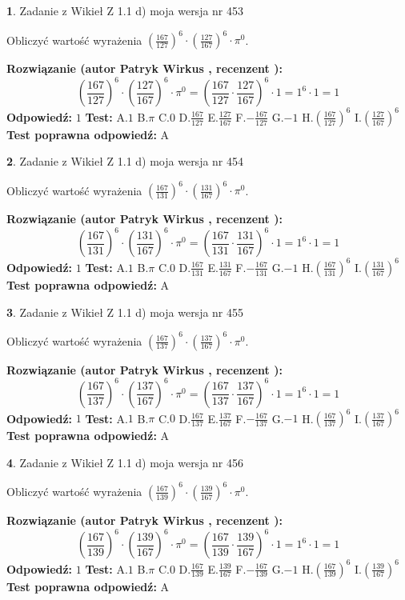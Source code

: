 \documentclass[12pt, a4paper]{article}
\theoremstyle{definition} %
\newtheorem{zad}{}
\newcommand{\zadStart}[1]{\begin{zad}#1\newline}
\newcommand{\zadStop}{\end{zad}}
\newcommand{\rozwStart}[2]{\noindent \textbf{Rozwiązanie (autor #1 , recenzent #2): }\newline}
\newcommand{\rozwStop}{\newline}
\newcommand{\odpStart}{\noindent \textbf{Odpowiedź:}\newline}
\newcommand{\odpStop}{\newline}
\newcommand{\testStart}{\noindent \textbf{Test:}\newline}
\newcommand{\testStop}{\newline}
\newcommand{\kluczStart}{\noindent \textbf{Test poprawna odpowiedź:}\newline}
\newcommand{\kluczStop}{\newline}
\begin{document}
\zadStart{Zadanie z Wikieł Z 1.1 d) moja wersja nr 453}

Obliczyć wartość wyrażenia $(\frac{167}{127})^{6} \cdot (\frac{127}{167})^{6} \cdot \pi^{0}$.
\zadStop
\rozwStart{Patryk Wirkus}{}
$$(\frac{167}{127})^{6} \cdot (\frac{127}{167})^{6} \cdot \pi^{0} = (\frac{167}{127} \cdot \frac{127}{167})^{6} \cdot 1 = 1^{6} \cdot 1 = 1$$
\rozwStop
\odpStart
$1$
\odpStop
\testStart
A.$1$ B.$\pi$ C.$0$ D.$\frac{167}{127}$ E.$\frac{127}{167}$
F.$-\frac{167}{127}$ G.$-1$
H.$(\frac{167}{127})^{6}$
I.$(\frac{127}{167})^{6}$
\testStop
\kluczStart
A
\kluczStop



\zadStart{Zadanie z Wikieł Z 1.1 d) moja wersja nr 454}

Obliczyć wartość wyrażenia $(\frac{167}{131})^{6} \cdot (\frac{131}{167})^{6} \cdot \pi^{0}$.
\zadStop
\rozwStart{Patryk Wirkus}{}
$$(\frac{167}{131})^{6} \cdot (\frac{131}{167})^{6} \cdot \pi^{0} = (\frac{167}{131} \cdot \frac{131}{167})^{6} \cdot 1 = 1^{6} \cdot 1 = 1$$
\rozwStop
\odpStart
$1$
\odpStop
\testStart
A.$1$ B.$\pi$ C.$0$ D.$\frac{167}{131}$ E.$\frac{131}{167}$
F.$-\frac{167}{131}$ G.$-1$
H.$(\frac{167}{131})^{6}$
I.$(\frac{131}{167})^{6}$
\testStop
\kluczStart
A
\kluczStop



\zadStart{Zadanie z Wikieł Z 1.1 d) moja wersja nr 455}

Obliczyć wartość wyrażenia $(\frac{167}{137})^{6} \cdot (\frac{137}{167})^{6} \cdot \pi^{0}$.
\zadStop
\rozwStart{Patryk Wirkus}{}
$$(\frac{167}{137})^{6} \cdot (\frac{137}{167})^{6} \cdot \pi^{0} = (\frac{167}{137} \cdot \frac{137}{167})^{6} \cdot 1 = 1^{6} \cdot 1 = 1$$
\rozwStop
\odpStart
$1$
\odpStop
\testStart
A.$1$ B.$\pi$ C.$0$ D.$\frac{167}{137}$ E.$\frac{137}{167}$
F.$-\frac{167}{137}$ G.$-1$
H.$(\frac{167}{137})^{6}$
I.$(\frac{137}{167})^{6}$
\testStop
\kluczStart
A
\kluczStop



\zadStart{Zadanie z Wikieł Z 1.1 d) moja wersja nr 456}

Obliczyć wartość wyrażenia $(\frac{167}{139})^{6} \cdot (\frac{139}{167})^{6} \cdot \pi^{0}$.
\zadStop
\rozwStart{Patryk Wirkus}{}
$$(\frac{167}{139})^{6} \cdot (\frac{139}{167})^{6} \cdot \pi^{0} = (\frac{167}{139} \cdot \frac{139}{167})^{6} \cdot 1 = 1^{6} \cdot 1 = 1$$
\rozwStop
\odpStart
$1$
\odpStop
\testStart
A.$1$ B.$\pi$ C.$0$ D.$\frac{167}{139}$ E.$\frac{139}{167}$
F.$-\frac{167}{139}$ G.$-1$
H.$(\frac{167}{139})^{6}$
I.$(\frac{139}{167})^{6}$
\testStop
\kluczStart
A
\kluczStop
\end{document}
